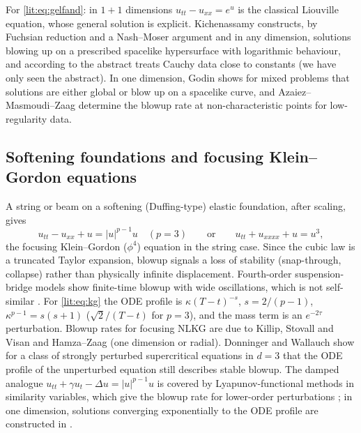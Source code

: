 For \eqref{lit:eq:gelfand}: in $1+1$ dimensions $u_{tt}-u_{xx}=e^u$ is the
classical Liouville equation, whose general solution is explicit.
Kichenassamy \cite{Kichenassamy1996} constructs, by Fuchsian reduction and a
Nash--Moser argument and in any dimension, solutions blowing up on a
prescribed spacelike hypersurface with logarithmic behaviour, and according
to the abstract treats Cauchy data close to constants (we have only seen
the abstract). In one dimension, Godin \cite{Godin2000} shows for mixed
problems that solutions are either global or blow up on a spacelike curve,
and Azaiez--Masmoudi--Zaag \cite{AzaiezMasmoudiZaag2016} determine the
blowup rate at non-characteristic points for low-regularity data.

\subsection{Softening foundations and focusing Klein--Gordon equations}
\label{lit:kg}
A string or beam on a softening (Duffing-type) elastic foundation, after
scaling, gives
\begin{equation}\label{lit:eq:kg}
  u_{tt}-u_{xx}+u=|u|^{p-1}u\quad(p=3)\qquad\text{or}\qquad
  u_{tt}+u_{xxxx}+u=u^{3},
\end{equation}
the focusing Klein--Gordon ($\phi^4$) equation in the string case. Since
the cubic law is a truncated Taylor expansion, blowup signals a loss of
stability (snap-through, collapse) rather than physically infinite
displacement. Fourth-order suspension-bridge models show finite-time blowup
with wide oscillations, which is not self-similar
\cite{GazzolaPavani2013,Gazzola2015}. For \eqref{lit:eq:kg} the ODE
profile is $\kappa(T-t)^{-s}$, $s=2/(p-1)$, $\kappa^{p-1}=s(s+1)$
($\sqrt2/(T-t)$ for $p=3$), and the mass term is an $e^{-2\tau}$
perturbation. Blowup rates for focusing NLKG are due to Killip, Stovall and
Visan \cite{KillipStovallVisan2014} and Hamza--Zaag \cite{HamzaZaag2013}
(one dimension or radial). Donninger and Wallauch \cite{DonningerWallauch2021}
show for a class of strongly perturbed supercritical equations in $d=3$
that the ODE profile of the unperturbed equation still describes stable
blowup. The damped analogue $u_{tt}+\gamma u_t-\Delta u=|u|^{p-1}u$ is
covered by Lyapunov-functional methods in similarity variables, which give
the blowup rate for lower-order perturbations
\cite{HamzaZaag2010,HamzaZaag2012}; in one dimension, solutions converging
exponentially to the ODE profile are constructed in \cite{HamzaSaidi2021}.


